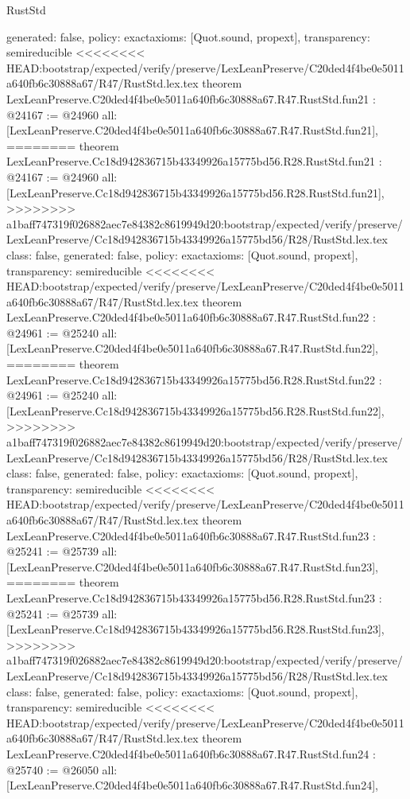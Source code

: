 \begin{lexlean}{RustStd}
\begin{coremodule}
{\begin{coremodule}
{{{{{{{{{{{{{{{{{{{{{{{{  generated: false,
  policy: exact{axioms: [Quot.sound, propext]},
  transparency: semireducible
}
<<<<<<<< HEAD:bootstrap/expected/verify/preserve/LexLeanPreserve/C20ded4f4be0e5011a640fb6c30888a67/R47/RustStd.lex.tex
theorem LexLeanPreserve.C20ded4f4be0e5011a640fb6c30888a67.R47.RustStd.fun21 : @24167 := @24960 {
  all: [LexLeanPreserve.C20ded4f4be0e5011a640fb6c30888a67.R47.RustStd.fun21],
========
theorem LexLeanPreserve.Cc18d942836715b43349926a15775bd56.R28.RustStd.fun21 : @24167 := @24960 {
  all: [LexLeanPreserve.Cc18d942836715b43349926a15775bd56.R28.RustStd.fun21],
>>>>>>>> a1baff747319f026882aec7e84382c8619949d20:bootstrap/expected/verify/preserve/LexLeanPreserve/Cc18d942836715b43349926a15775bd56/R28/RustStd.lex.tex
  class: false,
  generated: false,
  policy: exact{axioms: [Quot.sound, propext]},
  transparency: semireducible
}
<<<<<<<< HEAD:bootstrap/expected/verify/preserve/LexLeanPreserve/C20ded4f4be0e5011a640fb6c30888a67/R47/RustStd.lex.tex
theorem LexLeanPreserve.C20ded4f4be0e5011a640fb6c30888a67.R47.RustStd.fun22 : @24961 := @25240 {
  all: [LexLeanPreserve.C20ded4f4be0e5011a640fb6c30888a67.R47.RustStd.fun22],
========
theorem LexLeanPreserve.Cc18d942836715b43349926a15775bd56.R28.RustStd.fun22 : @24961 := @25240 {
  all: [LexLeanPreserve.Cc18d942836715b43349926a15775bd56.R28.RustStd.fun22],
>>>>>>>> a1baff747319f026882aec7e84382c8619949d20:bootstrap/expected/verify/preserve/LexLeanPreserve/Cc18d942836715b43349926a15775bd56/R28/RustStd.lex.tex
  class: false,
  generated: false,
  policy: exact{axioms: [Quot.sound, propext]},
  transparency: semireducible
}
<<<<<<<< HEAD:bootstrap/expected/verify/preserve/LexLeanPreserve/C20ded4f4be0e5011a640fb6c30888a67/R47/RustStd.lex.tex
theorem LexLeanPreserve.C20ded4f4be0e5011a640fb6c30888a67.R47.RustStd.fun23 : @25241 := @25739 {
  all: [LexLeanPreserve.C20ded4f4be0e5011a640fb6c30888a67.R47.RustStd.fun23],
========
theorem LexLeanPreserve.Cc18d942836715b43349926a15775bd56.R28.RustStd.fun23 : @25241 := @25739 {
  all: [LexLeanPreserve.Cc18d942836715b43349926a15775bd56.R28.RustStd.fun23],
>>>>>>>> a1baff747319f026882aec7e84382c8619949d20:bootstrap/expected/verify/preserve/LexLeanPreserve/Cc18d942836715b43349926a15775bd56/R28/RustStd.lex.tex
  class: false,
  generated: false,
  policy: exact{axioms: [Quot.sound, propext]},
  transparency: semireducible
}
<<<<<<<< HEAD:bootstrap/expected/verify/preserve/LexLeanPreserve/C20ded4f4be0e5011a640fb6c30888a67/R47/RustStd.lex.tex
theorem LexLeanPreserve.C20ded4f4be0e5011a640fb6c30888a67.R47.RustStd.fun24 : @25740 := @26050 {
  all: [LexLeanPreserve.C20ded4f4be0e5011a640fb6c30888a67.R47.RustStd.fun24],
}}}}}}}}}}}}}}}}}}}}}}}}}}}
\end{coremodule}}
\end{coremodule}
\end{lexlean}
